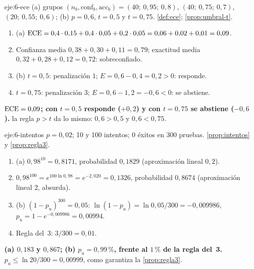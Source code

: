 \begin{solucion}{eje:6-ece}
\datos (a) grupos $(n_b,\mathrm{conf}_b,\mathrm{acc}_b)=(40;\allowbreak\ 0{,}95;\allowbreak\ 0{,}8)$, $(40;\allowbreak\ 0{,}75;\allowbreak\ 0{,}7)$, $(20;\allowbreak\ 0{,}55;\allowbreak\ 0{,}6)$; (b) $p=0{,}6$, $t=0{,}5$ y $t=0{,}75$.
\planteamiento \cref{def:ece}; \cref{prop:umbral-t}.
\pasos
\begin{enumerate}[label=\arabic*.]
  \item (a) $\operatorname{ECE}=0{,}4\cdot 0{,}15+0{,}4\cdot 0{,}05+0{,}2\cdot 0{,}05=0{,}06+0{,}02+0{,}01=0{,}09$.
  \item Confianza media $0{,}38+0{,}30+0{,}11=0{,}79$; exactitud media $0{,}32+0{,}28+0{,}12=0{,}72$: sobreconfiado.
  \item (b) $t=0{,}5$: penalización $1$; $E=0{,}6-0{,}4=0{,}2>0$: responde.
  \item $t=0{,}75$: penalización $3$; $E=0{,}6-1{,}2=-0{,}6<0$: se abstiene.
\end{enumerate}
\resultado \textbf{$\operatorname{ECE}=0{,}09$; con $t=0{,}5$ responde ($+0{,}2$) y con $t=0{,}75$ se abstiene ($-0{,}6$).}
\comprobacion la regla $p>t$ da lo mismo: $0{,}6>0{,}5$ y $0{,}6<0{,}75$.
\end{solucion}

\begin{solucion}{eje:6-intentos}
\datos $p=0{,}02$; 10 y 100 intentos; 0 éxitos en 300 pruebas.
\planteamiento \cref{prop:intentos} y \cref{prop:regla3}.
\pasos
\begin{enumerate}[label=\arabic*.]
  \item (a) $0{,}98^{10}=0{,}8171$, probabilidad $0{,}1829$ (aproximación lineal $0{,}2$).
  \item $0{,}98^{100}=e^{100\ln 0{,}98}=e^{-2{,}020}=0{,}1326$, probabilidad $0{,}8674$ (aproximación lineal $2$, absurda).
  \item (b) $(1-p_u)^{300}=0{,}05$: $\ln(1-p_u)=\ln 0{,}05/300=-0{,}009986$, $p_u=1-e^{-0{,}009986}=0{,}00994$.
  \item Regla del~3: $3/300=0{,}01$.
\end{enumerate}
\resultado \textbf{(a) $0{,}183$ y $0{,}867$; (b) $p_u=0{,}99\,\%$, frente al $1\,\%$ de la regla del~3.}
\comprobacion $p_u\le\ln 20/300=0{,}00999$, como garantiza la \cref{prop:regla3}.
\end{solucion}

